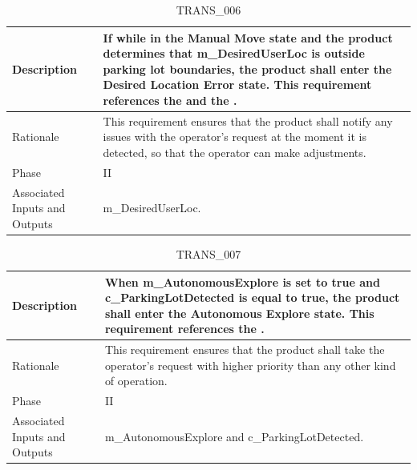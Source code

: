 \documentclass{article}
\begin{document}
\begin{table}[!h]
\begin{center}
\caption {TRANS\_006} 
\label{TRANS_006}
\begin{tabular}{ | m{3cm} | m{11cm} | }
\hline
Description & If while in the Manual Move state and the product determines that m\_DesiredUserLoc is outside parking lot boundaries, the product shall enter the Desired Location Error state. This requirement references the \nameref{Manual Move State} and the \nameref{Desired Location Error State}. \\
\hline
Rationale & This requirement ensures that the product shall notify any issues with the operator's request at the moment it is detected, so that the operator can make adjustments. \\
\hline
Phase & II \\
\hline
Associated Inputs and Outputs & m\_DesiredUserLoc. \\
\hline
\end{tabular}
\end{center}
\end{table}

\begin{table}[!h]
\begin{center}
\caption {TRANS\_007} 
\label{TRANS_007}
\begin{tabular}{ | m{3cm} | m{11cm} | }
\hline
Description & When m\_AutonomousExplore is set to true and c\_ParkingLotDetected is equal to true, the product shall enter the Autonomous Explore state. This requirement references the \nameref{Autonomous Explore State}. \\
\hline
Rationale & This requirement ensures that the product shall take the operator's request with higher priority than any other kind of operation. \\
\hline
Phase & II \\
\hline
Associated Inputs and Outputs & m\_AutonomousExplore and c\_ParkingLotDetected. \\
\hline
\end{tabular}
\end{center}
\end{table}
\end{document}
